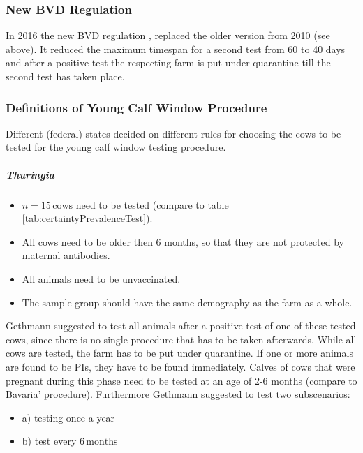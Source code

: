 \subsubsection{New BVD Regulation}
In 2016 the new BVD regulation \citep{bvdverordnungaenderung},\citep{bvdvonew} replaced the older version from 2010 (see above). It reduced the maximum timespan for a second test from 60 to 40 days and after a positive test the respecting farm is put under quarantine till the second test has taken place.
\subsubsection{Definitions of Young Calf Window Procedure}\label{chap:ycwdef}
Different (federal) states decided on different rules for choosing the cows to be tested for the young calf window testing procedure. 
\subparagraph{Thuringia}\label{chap:stratThuringia}
\begin{itemize}
\item $n = 15\,\text{cows}$ need to be tested (compare to table \ref{tab:certaintyPrevalenceTest}).
\item All cows need to be older then 6 months, so that they are not protected by maternal antibodies.
\item All animals need to be unvaccinated.
\item The sample group should have the same demography as the farm as a whole.
\end{itemize}
Gethmann suggested to test all animals after a positive test of one of these tested cows, since there is no single procedure that has to be taken afterwards. While all cows are tested, the farm has to be put under quarantine. If one or more animals are found to be PIs, they have to be found immediately. Calves of cows that were pregnant during this phase need to be tested at an age of 2-6 months (compare to Bavaria' procedure). Furthermore Gethmann suggested to test two subscenarios:
\begin{itemize}
\item a) testing once a year
\item b) test every $6\,\text{months}$
\end{itemize}

